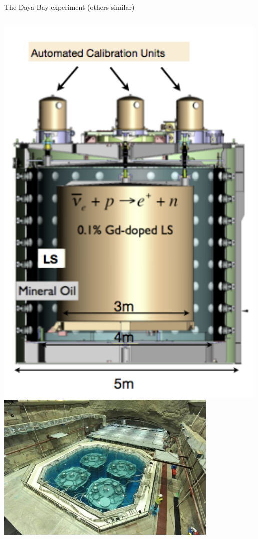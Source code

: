 \begin{frame}{The Daya Bay experiment (others similar)}

\begin{columns}
  \begin{column}{0.33\textwidth}
   \centering
     \includegraphics[width=0.99\textwidth]{./images/3nu/reactor/dayabay_1AD.png}\\
     \includegraphics[width=0.80\textwidth]{./images/3nu/reactor/dayabay_photo.png}\\

\end{column}
\end{columns}
\end{frame}
